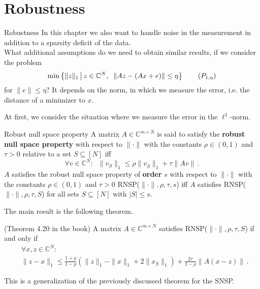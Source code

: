 \documentclass[11pt]{beamer}
\newcommand{\CC}{\mathbb{C}}
\renewcommand{\emph}{\textbf}
\begin{document}
\section{Robustness}

\begin{frame}{Robustness}
In this chapter we also want to handle noise in the measurement in addition to a sparsity deficit of the data.\\
 What additional assumptions do we need to obtain similar results, if we consider the problem
 \[\min\left\{\|z\|_1\,\big|\,z\in \CC^N,\;\;\|Az-(Ax+e)\|\le \eta\right\}\tag{$P_{1,\eta}$}\]
 for \(\|e\|\le \eta\)?
 It depends on the norm, in which we measure the error, i.e. the distance of a minimizer to \(x\).
\end{frame}


\begin{frame}{}

    At first, we consider the situation where we measure the error in the \(\ell^1\)-norm.
    \begin{Def}
    {Robust null space property}{} A matrix \(A\in\CC^{m\times N}\) is said to satisfy the \emph{robust null space property} with respect to \(\|\cdot\|\) with the constants \(\rho\in (0,1)\) and \(\tau>0\) relative to a set \(S\subseteq[N]\) iff
    \[\forall v\in \CC^N:\;\; \|v_S\|_1\le \rho\|v_{\overline S}\|_1+\tau \|Av\|\,.\tag{RNSP($\|\cdot\|,\rho,\tau,S$)}\]
    \(A \) satisfies the robust null space property of \emph{order} \(s\) with respect to \(\|\cdot\|\) with the constants \(\rho\in (0,1)\) and \(\tau>0\) RNSP(\(\|\cdot\|,\rho,\tau, s\)) iff \(A \) satisfies RNSP(\(\|\cdot\|,\rho,\tau,S\)) for all sets \(S\subseteq[N]\) with \(|S|\le s\).
    \end{Def}
\end{frame}



\begin{frame}{}
    The main result is the following theorem.
    \begin{Satzz}
    {(Theorem 4.20 in the book)}{}
    A matrix \(A\in\CC^{m\times N}\) satisfies RNSP(\(\|\cdot\|,\rho,\tau,S\)) if and only if 
    \begin{align*}
    &\forall x,z\in \CC^N:\\ &\|z-x\|_1\le \frac{1+\rho}{1-\rho}(\|z\|_1-\|x\|_1+2\|x_{\overline S}\|_1)+\frac{2\tau}{1-\rho}\|A(x-z)\|\,.
    \end{align*}
    \end{Satzz}
    This is a generalization of the previously discussed theorem for the SNSP.

\end{frame}
\end{document}
